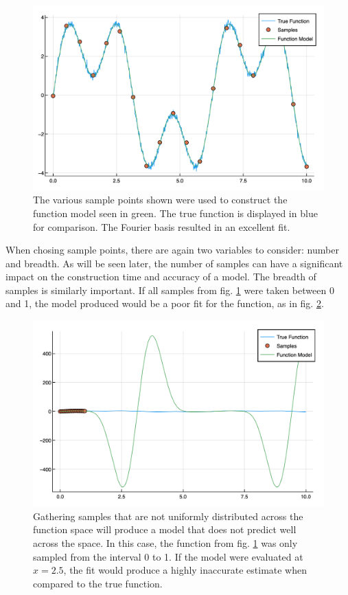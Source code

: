 \begin{figure}%
\centering
\includegraphics[scale = 0.43]{Figures/2dFourier}
\caption{The various sample points shown were used to construct the function model seen in green. The true function is displayed in blue for comparison. The Fourier basis resulted in an excellent fit. 
\label{fig:2dFourier}} 
\end{figure}

\par When chosing sample points, there are again two variables to consider: number and breadth. As will be seen later, the number of samples can have a significant impact on the construction time and accuracy of a model. The breadth of samples is similarly important. If all samples from fig. \ref{fig:2dFourier} were taken between 0 and 1, the model produced would be a poor fit for the function, as in fig. \ref{fig:poorSamps}. 

\begin{figure}%
\centering
\includegraphics[scale = 0.6]{Figures/poorSamps}
\caption{Gathering samples that are not uniformly distributed across the function space will produce a model that does not predict well across the space. In this case, the function from fig. \ref{fig:2dFourier} was only sampled from the interval 0 to 1. If the model were evaluated at $x=2.5$, the fit would produce a highly inaccurate estimate when compared to the true function.
\label{fig:poorSamps}} 
\end{figure}

